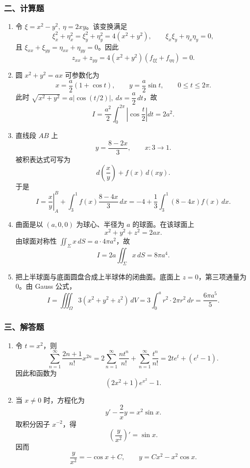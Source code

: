 \subsubsection*{二、计算题}
\begin{enumerate}
  \item 令 $\xi=x^2-y^2,\ \eta=2xy$。该变换满足
  \[
  \xi_x^2+\eta_x^2=\xi_y^2+\eta_y^2=4(x^2+y^2),\qquad
  \xi_x\xi_y+\eta_x\eta_y=0,
  \]
  且 $\xi_{xx}+\xi_{yy}=\eta_{xx}+\eta_{yy}=0$。因此
  \[
  z_{xx}+z_{yy}=4(x^2+y^2)(f_{\xi\xi}+f_{\eta\eta})=0.
  \]
  \item 圆 $x^2+y^2=ax$ 可参数化为
  \[
  x=\frac a2(1+\cos t),\qquad y=\frac a2\sin t,\qquad 0\le t\le 2\pi.
  \]
  此时 $\sqrt{x^2+y^2}=a|\cos(t/2)|,\ ds=\dfrac a2\,dt$，故
  \[
  I=\frac{a^2}{2}\int_0^{2\pi}\left|\cos\frac t2\right|dt=2a^2.
  \]
  \item 直线段 $AB$ 上
  \[
  y=\frac{8-2x}{3},\qquad x:3\to 1.
  \]
  被积表达式可写为
  \[
  d\!\left(\frac{x}{y}\right)+f(x)\,d(xy).
  \]
  于是
  \[
  I=\left.\frac{x}{y}\right|_A^B+\int_3^1 f(x)\frac{8-4x}{3}\,dx
  =-4+\frac13\int_3^1(8-4x)f(x)\,dx.
  \]
  \item 曲面是以 $(a,0,0)$ 为球心、半径为 $a$ 的球面。在该球面上
  \[
  x^2+y^2+z^2=2ax.
  \]
  由球面对称性 $\iint_\Sigma x\,dS=a\cdot 4\pi a^2$，故
  \[
  I=2a\iint_\Sigma x\,dS=8\pi a^4.
  \]
  \item 把上半球面与底面圆盘合成上半球体的闭曲面。底面上 $z=0$，第三项通量为 $0$。由 Gauss 公式，
  \[
  I=\iiint_\Omega 3(x^2+y^2+z^2)\,dV
  =3\int_0^a r^2\cdot 2\pi r^2\,dr
  =\frac{6\pi a^5}{5}.
  \]
\end{enumerate}

\subsubsection*{三、解答题}
\begin{enumerate}
  \item 令 $t=x^2$，则
  \[
  \sum_{n=1}^{\infty}\frac{2n+1}{n!}x^{2n}
  =2\sum_{n=1}^{\infty}\frac{n t^n}{n!}+\sum_{n=1}^{\infty}\frac{t^n}{n!}
  =2te^t+(e^t-1).
  \]
  因此和函数为
  \[
  (2x^2+1)e^{x^2}-1.
  \]
  \item 当 $x\ne0$ 时，方程化为
  \[
  y'-\frac2x y=x^2\sin x.
  \]
  取积分因子 $x^{-2}$，得
  \[
  \left(\frac{y}{x^2}\right)'=\sin x.
  \]
  因而
  \[
  \frac{y}{x^2}=-\cos x+C,\qquad y=Cx^2-x^2\cos x.
  \]
\end{enumerate}

